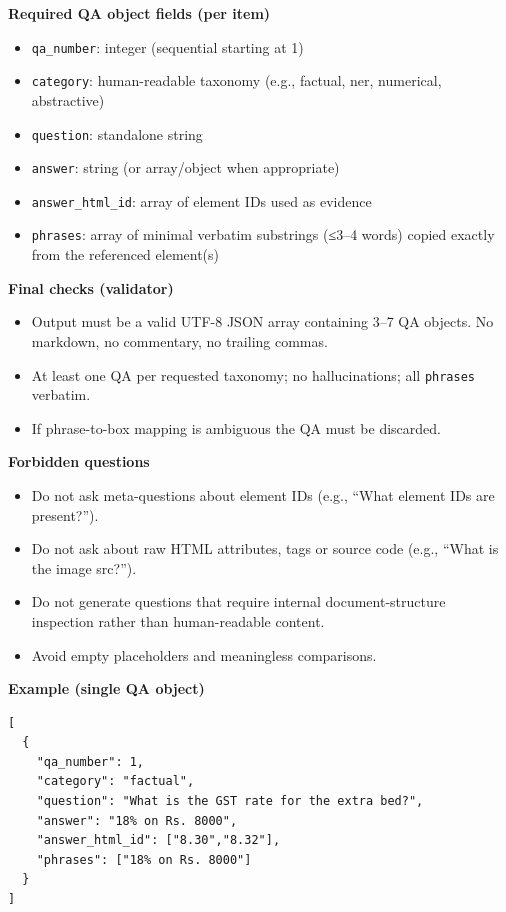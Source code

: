 \begin{tcolorbox} [myprompt, title=Required Fields \& Forbidden Questions]


\medskip
\noindent\textbf{Required QA object fields (per item)}
\begin{itemize}
  \item \texttt{qa\_number}: integer (sequential starting at 1)
  \item \texttt{category}: human-readable taxonomy (e.g., factual, ner, numerical, abstractive)
  \item \texttt{question}: standalone string
  \item \texttt{answer}: string (or array/object when appropriate)
  \item \texttt{answer\_html\_id}: array of element IDs used as evidence
  \item \texttt{phrases}: array of minimal verbatim substrings (≤3–4 words) copied exactly from the referenced element(s)
\end{itemize}

\medskip
\noindent\textbf{Final checks (validator)}
\begin{itemize}
  \item Output must be a valid UTF-8 JSON array containing 3–7 QA objects. No markdown, no commentary, no trailing commas.
  \item At least one QA per requested taxonomy; no hallucinations; all \texttt{phrases} verbatim.
  \item If phrase-to-box mapping is ambiguous the QA must be discarded.
\end{itemize}

\medskip
\noindent\textbf{Forbidden questions}
\begin{itemize}
  \item Do not ask meta-questions about element IDs (e.g., “What element IDs are present?”).
  \item Do not ask about raw HTML attributes, tags or source code (e.g., “What is the image src?”).
  \item Do not generate questions that require internal document-structure inspection rather than human-readable content.
  \item Avoid empty placeholders and meaningless comparisons.
\end{itemize}

\medskip
\noindent\textbf{Example (single QA object)}
\begin{verbatim}
[
  {
    "qa_number": 1,
    "category": "factual",
    "question": "What is the GST rate for the extra bed?",
    "answer": "18% on Rs. 8000",
    "answer_html_id": ["8.30","8.32"],
    "phrases": ["18% on Rs. 8000"]
  }
]
\end{verbatim}

\end{tcolorbox}


